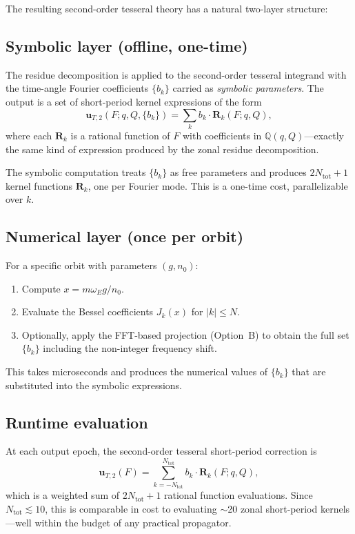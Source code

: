 \documentclass[11pt]{article}
\begin{document}
The resulting second-order tesseral theory has a natural two-layer
structure:

\subsection{Symbolic layer (offline, one-time)}

The residue decomposition is applied to the second-order tesseral
integrand with the time-angle Fourier coefficients $\{b_k\}$ carried as
\emph{symbolic parameters}. The output is a set of short-period kernel
expressions of the form
\begin{equation}
\bm u_{T,2}(F; q, Q, \{b_k\})
= \sum_k b_k \cdot \bm R_k(F; q, Q),
\end{equation}
where each $\bm R_k$ is a rational function of $F$ with coefficients in
$\mathbb{Q}(q, Q)$---exactly the same kind of expression produced by the
zonal residue decomposition.

The symbolic computation treats $\{b_k\}$ as free parameters and produces
$2N_{\mathrm{tot}} + 1$ kernel functions $\bm R_k$, one per Fourier mode.
This is a one-time cost, parallelizable over $k$.

\subsection{Numerical layer (once per orbit)}

For a specific orbit with parameters $(g, n_0)$:
\begin{enumerate}
\item Compute $x = m\omega_E g / n_0$.
\item Evaluate the Bessel coefficients $J_k(x)$ for $|k| \le N$.
\item Optionally, apply the FFT-based projection (Option~B) to obtain
the full set $\{b_k\}$ including the non-integer frequency shift.
\end{enumerate}

This takes microseconds and produces the numerical values of $\{b_k\}$
that are substituted into the symbolic expressions.

\subsection{Runtime evaluation}

At each output epoch, the second-order tesseral short-period correction is
\begin{equation}
\bm u_{T,2}(F)
= \sum_{k=-N_{\mathrm{tot}}}^{N_{\mathrm{tot}}}
b_k \cdot \bm R_k(F; q, Q),
\end{equation}
which is a weighted sum of $2N_{\mathrm{tot}} + 1$ rational function
evaluations. Since $N_{\mathrm{tot}} \lesssim 10$, this is comparable in
cost to evaluating $\sim$20 zonal short-period kernels---well within the
budget of any practical propagator.
\end{document}
